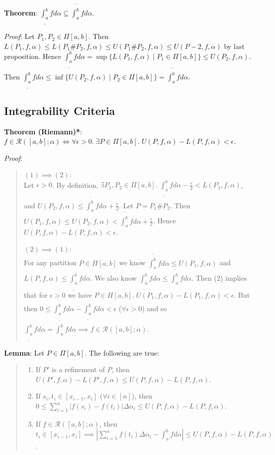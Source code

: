 \documentclass[11pt]{article}
\begin{document}
\textbf{Theorem}: $\underline{\int_a^b} f d\alpha \subseteq \overline{\int_a^b} f d \alpha$.

\emph{Proof}: Let $P_1, P_2 \in \Pi[a,b]$. Then $L(P_1, f, \alpha) \leq L(P_1 \# P_2, f, \alpha) \leq U(P_1 \# P_2, f, \alpha) \leq U(P-2, f, \alpha)$ by last proposition. Hence $\underline{\int_a^b} f d\alpha = \sup\{L(P_1, f, \alpha) \;|\; P_1 \in \Pi[a,b]\} \leq U(P_2, f, \alpha)$. Then $\underline{\int_a^b} f d\alpha \leq \inf \{U(P_2, f, \alpha) \;|\; P_2 \in \Pi[a,b]\} = \overline{\int_a^b} f d\alpha$.

\subsection{Integrability Criteria}

\textbf{Theorem (Riemann)*}: $f \in \mathcal{R}([a,b]; \alpha) \iff \forall \epsilon > 0.\; \exists P \in \Pi[a,b].\; U(P, f, \alpha) - L(P, f, \alpha) < \epsilon$.

\emph{Proof}:
\begin{quote}\vspace{-0.3cm}
$(1) \implies (2)$:\\
Let $\epsilon > 0$. By definition, $\exists P_1, P_2 \in \Pi[a,b].\; \underline{\int_a^b} f d\alpha - \frac{\epsilon}{2} < L(P_1, f, \alpha)$, and $U(P_2, f, \alpha) \leq \overline{\int_a^b} f d\alpha + \frac{\epsilon}{2}$. Let $P = P_1 \# P_2$. Then $U(P_1, f, \alpha) \leq U(P_2, f, \alpha) < \overline{\int_a^b} f d\alpha + \frac{\epsilon}{2}$. Hence $U(P, f, \alpha) - L(P, f , \alpha) < \epsilon$.

$(2) \implies (1)$:\\
For any partition $P \in \Pi[a,b]$ we know $\overline{\int_a^b} f d\alpha \leq U(P_1, f, \alpha)$ and $L(P, f, \alpha) \leq \underline{\int_a^b} f d\alpha$. We also know $\underline{\int_a^b} f d\alpha \leq \overline{\int_a^b} f d\alpha$. Then (2) implies that for $\epsilon > 0$ we have $P \in \Pi[a,b].\; U(P_1, f, \alpha) - L(P_1, f, \alpha) < \epsilon$. But then $0 \leq \overline{\int_a^b} f d\alpha - \underline{\int_a^b} f d\alpha < \epsilon$ ($\forall \epsilon > 0$) and so $\underline{\int_a^b} f d\alpha = \overline{\int_a^b} f d\alpha \implies f \in \mathcal{R}([a,b]; \alpha)$.
\end{quote}

\textbf{Lemma}: Let $P \in \Pi[a,b]$. The following are true:
\begin{quote}\vspace{-0.3cm}
	\begin{enumerate}
	\item If $P'$ is a refinement of $P$, then $U(P', f, \alpha) - L(P', f, \alpha) \leq U(P, f, \alpha) - L(P, f, \alpha)$.
	\item If $s_i, t_i \in [x_{i-1}, x_i]$ ($\forall i \in [n]$), then $0 \leq \sum_{i=1}^n |f(s_i) - f(t_i)| \Delta \alpha_i \leq U(P, f, \alpha) - L(P, f, \alpha)$.
	\item If $f \in \mathcal{R}([a,b]; \alpha)$, then $t_i \in [x_{i-1}, x_i] \implies |\sum_{i=1}^n f(t_i) \Delta \alpha_i - \int_a^b f d\alpha| \leq U(P, f, \alpha) - L(P, f, \alpha)$.
	\end{enumerate}
\end{quote}
\end{document}
